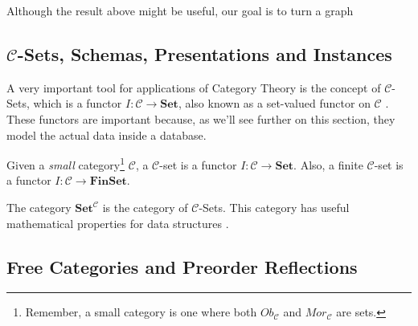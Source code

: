Although the result above might be useful, our goal is to turn a graph

\subsection{$\mathcal C$-Sets, Schemas, Presentations and Instances}

A very important tool for applications of Category Theory is the
concept of $\mathcal C$-Sets, which is a functor $I:\mathcal C \to \mathbf{Set}$,
also known as a set-valued functor on $\mathcal C$ \citep{fong2019invitation}.
These functors are important because, as we'll see further on this section,
they model the actual data inside a database.


\begin{definition}
  Given a \textit{small} category\footnote{Remember, a small category is one where both
  $Ob_\mathcal C$ and $Mor_\mathcal C$ are sets.} $\mathcal C$, a $\mathcal C$-set
  is a functor $I:\mathcal C \to \mathbf{Set}$. Also, a finite $\mathcal C$-set
  is a functor $I:\mathcal C \to \mathbf{FinSet}$.
\end{definition}

The category $\mathbf{Set}^{\mathcal C}$ is the category of $\mathcal C$-Sets. This category
has useful mathematical properties for data structures \citep{patterson2021categorical}.


\subsection{Free Categories and Preorder Reflections}
